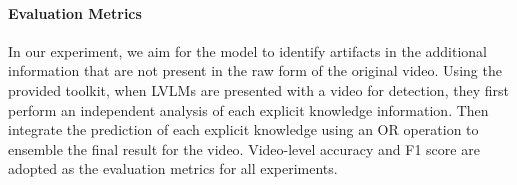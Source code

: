 
\paragraph{Evaluation Metrics}
In our experiment, we aim for the model to identify artifacts in the additional information that are not present in the raw form of the original video. Using the provided toolkit, when LVLMs are presented with a video for detection, they first perform an independent analysis of each explicit knowledge information. Then integrate the prediction of each explicit knowledge using an OR operation to ensemble the final result for the video. Video-level accuracy and F1 score are adopted as the evaluation metrics for all experiments.




